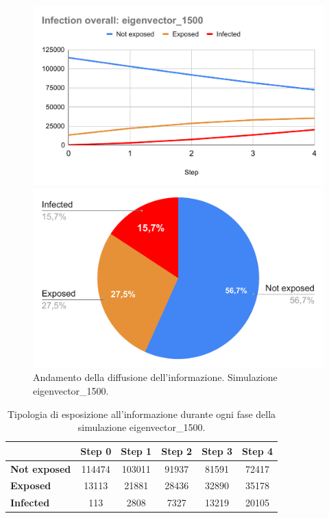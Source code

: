             \begin{figure}[H]
                \centering
                \begin{minipage}[c]{0.55\textwidth}
                    \includegraphics[width=\textwidth]{resources/charts/Infection overall_ eigenvector_1500.pdf}
                \end{minipage}
                \hfill
                \begin{minipage}[c]{0.44\textwidth}
                    \includegraphics[width=\textwidth]{resources/charts/pie_eig_1500.pdf}
                \end{minipage}
                \caption{Andamento della diffusione dell'informazione. Simulazione eigenvector\_1500.}
            \end{figure}
        
        \begin{table}[H]
            \centering
            \begin{tabular}{l|c|c|c|c|c}
                        & Step 0 & Step 1 & Step 2 & Step 3 & Step 4 \\ \hline
            \textbf{Not exposed} & 114474 & 103011 & 91937  & 81591  & 72417  \\ \hline
            \textbf{Exposed}     & 13113  & 21881  & 28436  & 32890  & 35178  \\ \hline
            \textbf{Infected}    & 113    & 2808   & 7327   & 13219  & 20105  \\
            \end{tabular}
            \caption{Tipologia di esposizione all'informazione durante ogni fase della simulazione eigenvector\_1500.}
        \end{table}
        
